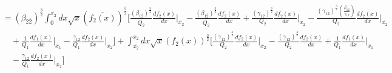 \documentclass[fleqn, 10pt]{article}
\begin{document}
                            \begin{equation*}
                            \begin{split}
                                &= (\beta_{2\overline{2}})^\frac{3}{2} \int^{\overline{x_2}}_0 dx \sqrt{x} (\overline{f_2(x)})^\frac{3}{2} \Biggl[   \frac{(\beta_{1\overline{2}})^\frac{3}{2}}{\overline{Q_2}} \frac{d\overline{f_2(x)}}{dx} \Bigg|_{\overline{x_2}} - \frac{(\beta_{1\overline{2}})^\frac{3}{2}}{\overline{Q_2}}\frac{d\overline{f_2(x)}}{dx} +   \frac{(\gamma_{12})^\frac{3}{2}}{Q_2} \frac{df_2(x)}{dx} \Bigg|_{x_2} -   \frac{(\gamma_{12})^\frac{3}{2}\left(\frac{\beta_{1\overline{2}}}{\gamma_{12}}\right)}{Q_2} \frac{d\overline{f_2(x)}}{dx} \Bigg|_{\overline{x_2}} \\ & \quad +   \frac{1}{Q_1} \frac{df_1(x)}{dx} \Bigg|_{x_1}  -   \frac{\gamma_{12}}{Q_1} \frac{df_2(x)}{dx} \Bigg|_{x_2} \Biggr] + \int^{x_2}_{\overline{x_2}} dx \sqrt{x} (f_2(x))^\frac{3}{2} \Biggl[   \frac{(\gamma_{12})^\frac{3}{2}}{Q_2} \frac{df_2(x)}{dx} \Bigg|_{x_2} - \frac{(\gamma_{12})^\frac{3}{2}}{Q_2} \frac{df_2(x)}{dx} +   \frac{1}{Q_1} \frac{df_1(x)}{dx} \Bigg|_{x_1} \\ & \quad -   \frac{\gamma_{12}}{Q_1} \frac{df_2(x)}{dx} \Bigg|_{x_2} \Biggr]
                                \end{split}
                            \end{equation*}
\end{document}
